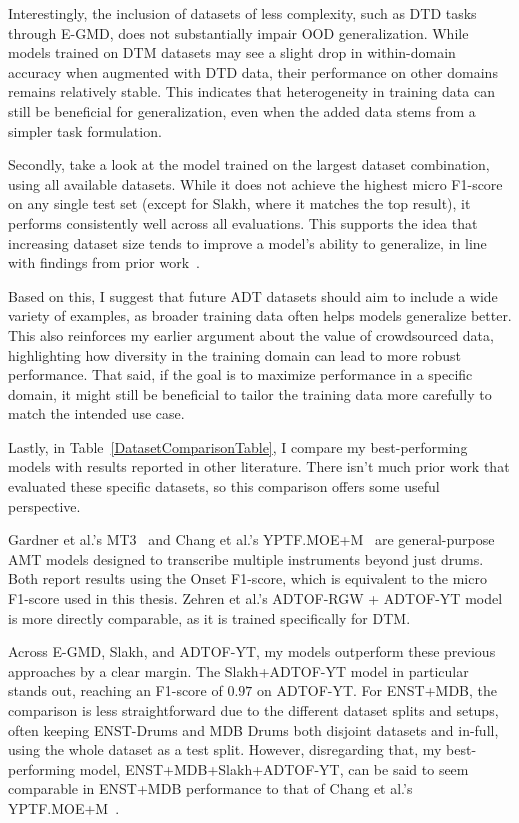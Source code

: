Interestingly, the inclusion of datasets of less complexity, such as \gls{DTD} tasks through E-GMD, does not substantially impair \gls{OOD} generalization. While models trained on \gls{DTM} datasets may see a slight drop in within-domain accuracy when augmented with \gls{DTD} data, their performance on other domains remains relatively stable. This indicates that heterogeneity in training data can still be beneficial for generalization, even when the added data stems from a simpler task formulation.

Secondly, take a look at the model trained on the largest dataset combination, using all available datasets. While it does not achieve the highest micro F1-score on any single test set (except for Slakh, where it matches the top result), it performs consistently well across all evaluations. This supports the idea that increasing dataset size tends to improve a model's ability to generalize, in line with findings from prior work~\cite{signals4040042}. 

Based on this, I suggest that future \gls{ADT} datasets should aim to include a wide variety of examples, as broader training data often helps models generalize better. This also reinforces my earlier argument about the value of crowdsourced data, highlighting how diversity in the training domain can lead to more robust performance. That said, if the goal is to maximize performance in a specific domain, it might still be beneficial to tailor the training data more carefully to match the intended use case.

Lastly, in Table~\ref{DatasetComparisonTable}, I compare my best-performing models with results reported in other literature. There isn't much prior work that evaluated these specific datasets, so this comparison offers some useful perspective. 

Gardner et al.'s MT3~\cite{gardner2022mt3multitaskmultitrackmusic} and Chang et al.'s YPTF.MOE+M~\cite{chang2024yourmt3+} are general-purpose \gls{AMT} models designed to transcribe multiple instruments beyond just drums. Both report results using the Onset F1-score, which  is equivalent to the micro F1-score used in this thesis. Zehren et al.'s ADTOF-RGW + ADTOF-YT model~\cite{signals4040042} is more directly comparable, as it is trained specifically for \gls{DTM}.

Across E-GMD, Slakh, and ADTOF-YT, my models outperform these previous approaches by a clear margin. The Slakh+ADTOF-YT model in particular stands out, reaching an F1-score of $0.97$ on ADTOF-YT. For ENST+MDB, the comparison is less straightforward due to the different dataset splits and setups, often keeping ENST-Drums and MDB Drums both disjoint datasets and in-full, using the whole dataset as a test split. However, disregarding that, my best-performing model, ENST+MDB+Slakh+ADTOF-YT, can be said to seem comparable in ENST+MDB performance to that of Chang et al.'s YPTF.MOE+M~\cite{chang2024yourmt3+}. 


